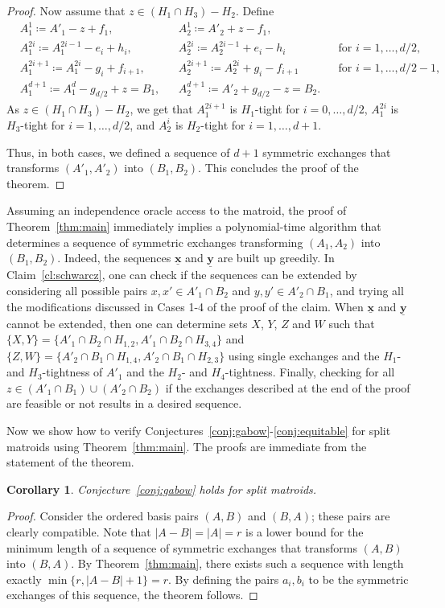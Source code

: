 \documentclass[11pt,a4paper]{article}
\theoremstyle{plain}
\newtheorem{cor}[thm]{Corollary}
\theoremstyle{definition}
\newcommand{\ul}[1]{\underline{\mathbf{#1}}}
\begin{document}
\begin{proof}
Now assume that $z\in (H_1\cap H_3)-H_2$. Define
\begin{align*}
    &A^1_1\coloneqq A'_1-z+f_1, &&A^1_2\coloneqq A'_2+z-f_1, &&\\
    &A^{2i}_1\coloneqq A^{2i-1}_1-e_i+h_i, &&A^{2i}_2\coloneqq A^{2i-1}_2+e_i-h_i && \text{for $i=1,\dots,d/2$,}\\
    &A^{2i+1}_1\coloneqq A^{2i}_1-g_i+f_{i+1}, &&A^{2i+1}_2\coloneqq A^{2i}_2+g_i-f_{i+1} && \text{for $i=1,\dots,d/2-1$,}\\
    &A^{d+1}_1\coloneqq A^{d}_1-g_{d/2}+z=B_1, &&A^{d+1}_2\coloneqq A'_2+g_{d/2}-z=B_2. &&
\end{align*}
As $z\in (H_1\cap H_3)-H_2$, we get that $A^{2i+1}_1$ is $H_1$-tight for $i=0,\dots,d/2$, $A^{2i}_1$ is $H_3$-tight for $i=1,\dots,d/2$, and $A^i_2$ is $H_2$-tight for $i=1,\dots,d+1$.

Thus, in both cases, we defined a sequence of $d+1$ symmetric exchanges that transforms $(A'_1,A'_2)$ into $(B_1,B_2)$. This concludes the proof of the theorem.
\end{proof}

Assuming an independence oracle access to the matroid, the proof of Theorem~\ref{thm:main} immediately implies a polynomial-time algorithm that determines a sequence of symmetric exchanges transforming $(A_1,A_2)$ into $(B_1,B_2)$. Indeed, the sequences $\ul{x}$ and $\ul{y}$ are built up greedily. In Claim~\ref{cl:schwarcz}, one can check if the sequences can be extended by considering all possible pairs $x,x'\in A'_1\cap B_2$ and $y,y'\in A'_2\cap B_1$, and trying all the modifications discussed in Cases 1-4 of the proof of the claim. When $\ul{x}$ and $\ul{y}$ cannot be extended, then one can determine sets $X$, $Y$, $Z$ and $W$ such that $\{X,Y\}=\{A'_1\cap B_2\cap H_{1,2},A'_1\cap B_2\cap H_{3,4}\}$ and $\{Z,W\}=\{A'_2\cap B_1\cap H_{1,4},A'_2\cap B_1\cap H_{2,3}\}$ using single exchanges and the $H_1$- and $H_3$-tightness of $A'_1$ and the $H_2$- and $H_4$-tightness. Finally, checking for all $z\in (A'_1\cap B_1)\cup (A'_2\cap B_2)$ if the exchanges described at the end of the proof are feasible or not results in a desired sequence.

Now we show how to verify Conjectures~\ref{conj:gabow}-\ref{conj:equitable} for split matroids using Theorem~\ref{thm:main}. The proofs are immediate from the statement of the theorem. 

\begin{cor}\label{cor:gabow}
Conjecture~\ref{conj:gabow} holds for split matroids.
\end{cor}
\begin{proof}
Consider the ordered basis pairs $(A,B)$ and $(B,A)$; these pairs are clearly compatible. Note that $|A-B|=|A|=r$ is a lower bound for the minimum length of a sequence of symmetric exchanges that transforms $(A,B)$ into $(B,A)$. By Theorem~\ref{thm:main}, there exists such a sequence with length exactly $\min\{r,|A-B|+1\}=r$. By defining the pairs $a_i,b_i$ to be the symmetric exchanges of this sequence, the theorem follows.  
\end{proof} 
 
\end{document}
